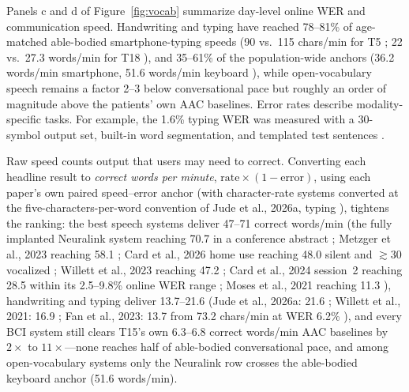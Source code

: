 \documentclass[11pt]{article}
\newcommand{\wpm}{words/min}
\newcommand{\cpm}{chars/min}
\begin{document}
Panels c and d of Figure~\ref{fig:vocab} summarize day-level online
WER and communication speed. Handwriting and typing have reached
78--81\% of
age-matched able-bodied smartphone-typing speeds (90 vs.\ 115 \cpm{}
for T5 \cite{willett2021, palin2019}; 22 vs.\ 27.3 \wpm{} for T18
\cite{jude2026typing, palin2019}), and 35--61\% of the population-wide
anchors (36.2 \wpm{} smartphone, 51.6 \wpm{} keyboard
\cite{palin2019, dhakal2018}),
while open-vocabulary speech remains a factor 2--3 below conversational
pace but roughly an order of magnitude above the patients' own AAC
baselines. Error rates describe modality-specific tasks. For example,
the 1.6\% typing WER was measured with a 30-symbol output set, built-in
word segmentation, and templated test sentences \cite{jude2026typing}.

Raw speed counts output that users may need to correct.
Converting each headline result
to \emph{correct words per minute}, $\text{rate}\times(1-\text{error})$,
using each paper's own paired speed--error anchor (with character-rate
systems converted at the five-characters-per-word convention of
Jude et al., 2026a, typing \cite{jude2026typing}),
tightens the ranking: the best speech systems deliver 47--71 correct \wpm{}
(the fully implanted Neuralink system reaching 70.7 in a conference
abstract \cite{pouratian2026}; Metzger et al., 2023 reaching 58.1
\cite{metzger2023}; Card et al., 2026 home use reaching 48.0 silent and
$\gtrsim$30 vocalized \cite{card2026}; Willett et al., 2023 reaching
47.2 \cite{willett2023}; Card et al., 2024 session~2 reaching 28.5
within its 2.5--9.8\% online WER range \cite{card2024}; Moses et al.,
2021 reaching 11.3 \cite{moses2021}),
handwriting and typing deliver
13.7--21.6 (Jude et al., 2026a: 21.6 \cite{jude2026typing}; Willett et
al., 2021: 16.9 \cite{willett2021}; Fan et al., 2023: 13.7 from 73.2
\cpm{} at WER 6.2\%
\cite{fan2023}), and every BCI system still clears T15's own 6.3--6.8 correct
\wpm{} AAC baselines by $2\times$ to $11\times$---none reaches half
of able-bodied conversational pace, and among open-vocabulary systems only
the Neuralink row crosses the able-bodied keyboard anchor (51.6 \wpm{}).
\end{document}
